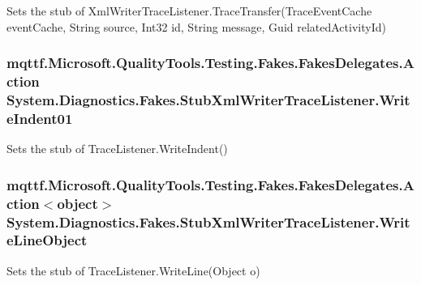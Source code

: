 Sets the stub of Xml\-Writer\-Trace\-Listener.\-Trace\-Transfer(\-Trace\-Event\-Cache event\-Cache, String source, Int32 id, String message, Guid related\-Activity\-Id)

\hypertarget{class_system_1_1_diagnostics_1_1_fakes_1_1_stub_xml_writer_trace_listener_a52fb3395823e88a14f832f6e152ee3cf}{
\subsubsection[{Write\-Indent01}]{\setlength{\rightskip}{0pt plus 5cm}mqttf.\-Microsoft.\-Quality\-Tools.\-Testing.\-Fakes.\-Fakes\-Delegates.\-Action System.\-Diagnostics.\-Fakes.\-Stub\-Xml\-Writer\-Trace\-Listener.\-Write\-Indent01}}\label{class_system_1_1_diagnostics_1_1_fakes_1_1_stub_xml_writer_trace_listener_a52fb3395823e88a14f832f6e152ee3cf}


Sets the stub of Trace\-Listener.\-Write\-Indent()

\hypertarget{class_system_1_1_diagnostics_1_1_fakes_1_1_stub_xml_writer_trace_listener_a5f6b6f9ed6d7244dfa8b5d3a5a64936b}{
\subsubsection[{Write\-Line\-Object}]{\setlength{\rightskip}{0pt plus 5cm}mqttf.\-Microsoft.\-Quality\-Tools.\-Testing.\-Fakes.\-Fakes\-Delegates.\-Action$<$object$>$ System.\-Diagnostics.\-Fakes.\-Stub\-Xml\-Writer\-Trace\-Listener.\-Write\-Line\-Object}}\label{class_system_1_1_diagnostics_1_1_fakes_1_1_stub_xml_writer_trace_listener_a5f6b6f9ed6d7244dfa8b5d3a5a64936b}


Sets the stub of Trace\-Listener.\-Write\-Line(\-Object o)

